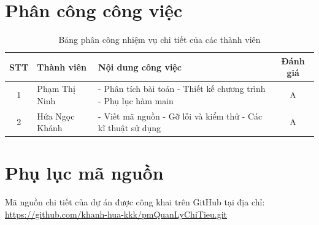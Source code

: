 \documentclass[12pt,letterpaper]{article}
\begin{document}
\section{Phân công công việc}
\begin{table}[htbp]
\centering
\begin{tabular}{|c|p{4cm}|p{6.5cm}|c|}
\hline
\textbf{STT} & \textbf{Thành viên} & \textbf{Nội dung công việc} & \textbf{Đánh giá} \\ \hline
1 & Phạm Thị Ninh & 
- Phân tích bài toán \newline 
- Thiết kế chương trình \newline 
- Phụ lục hàm main & A \\ \hline
2 & Hứa Ngọc Khánh & 
- Viết mã nguồn\newline
- Gỡ lỗi và kiểm thử \newline 
- Các kĩ thuật sử dụng & A \\ \hline
\end{tabular}
\caption{Bảng phân công nhiệm vụ chi tiết của các thành viên}
\label{tab:phan_cong_cong_viec}
\end{table}

\newpage
\section{Phụ lục mã nguồn}
Mã nguồn chi tiết của dự án được công khai trên GitHub tại địa chỉ: \url{https://github.com/khanh-hua-kkk/pmQuanLyChiTieu.git}
\end{document}
